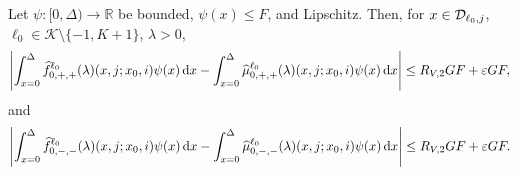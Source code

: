 \begin{lem}\label{lem: Dcoajc}
	Let \(\psi:[0,\Delta)\to \mathbb R\) be bounded, \(\psi(x)\leq F\), and Lipschitz. Then, for \(x\in\mathcal{D}_{\ell_0,j}\), \(\ell_0\in\mathcal K\setminus\{-1,K+1\}\), \(\lambda > 0\),
	\begin{align}
            	\left|\int_{x=0}^\Delta \widehat f^{\ell_0}_{0,+,+}(\lambda)(x,j; x_0,i)\psi(x)\, \mathrm{d} x - \int_{x=0}^\Delta\widehat \mu^{\ell_0}_{0,+,+}(\lambda)(x,j; x_0,i)\psi(x)\, \mathrm{d} x\right| \leq R_{V,2} GF + \varepsilon GF, \label{eqn: anue}
            \end{align}
            and 
            \begin{align}
            	\left|\int_{x=0}^\Delta \widehat f^{\ell_0}_{0,-,-}(\lambda)(x,j; x_0,i)\psi(x)\, \mathrm{d} x - \int_{x=0}^\Delta\widehat \mu^{\ell_0}_{0,-,-}(\lambda)(x,j; x_0,i)\psi(x)\, \mathrm{d} x\right| \leq R_{V,2} GF + \varepsilon GF. \label{eqn: anue2}
            \end{align} 
\end{lem}
